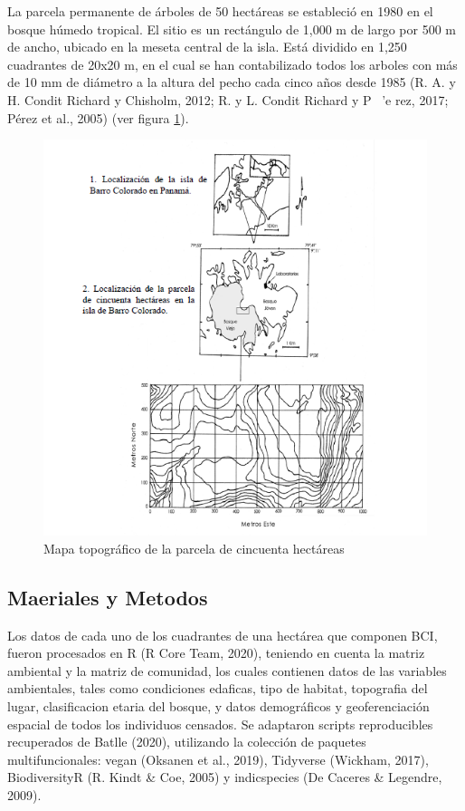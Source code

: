 \documentclass[11pt,]{article}
\begin{document}
La parcela permanente de árboles de 50 hectáreas se estableció en 1980
en el bosque húmedo tropical. El sitio es un rectángulo de 1,000 m de
largo por 500 m de ancho, ubicado en la meseta central de la isla. Está
dividido en 1,250 cuadrantes de 20x20 m, en el cual se han contabilizado
todos los arboles con más de 10 mm de diámetro a la altura del pecho
cada cinco años desde 1985 (R. A. y H. Condit Richard y Chisholm, 2012;
R. y L. Condit Richard y P ~'e rez, 2017; Pérez et al., 2005) (ver
figura \ref{fig:mapabarro}).

\begin{figure}
\centering
\includegraphics[width=1.00000\textwidth]{mapa Barro Colorado.png}
\caption{Mapa topográfico de la parcela de cincuenta hectáreas
\label{fig:mapabarro}}
\end{figure}

\subsection{Maeriales y Metodos}\label{maeriales-y-metodos}

Los datos de cada uno de los cuadrantes de una hectárea que componen
BCI, fueron procesados en R (R Core Team, 2020), teniendo en cuenta la
matriz ambiental y la matriz de comunidad, los cuales contienen datos de
las variables ambientales, tales como condiciones edaficas, tipo de
habitat, topografia del lugar, clasificacion etaria del bosque, y datos
demográficos y geoferenciación espacial de todos los individuos
censados. Se adaptaron scripts reproducibles recuperados de Batlle
(2020), utilizando la colección de paquetes multifuncionales: vegan
(Oksanen et al., 2019), Tidyverse (Wickham, 2017), BiodiversityR (R.
Kindt \& Coe, 2005) y indicspecies (De Caceres \& Legendre, 2009).
\end{document}
